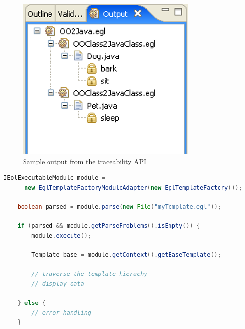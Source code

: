 \begin{figure}[htbp]
  \begin{center}
    \leavevmode
    \includegraphics[scale=0.6]{images/TraceView}
  \end{center}
  \caption{Sample output from the traceability API.}
  \label{fig:traceability}
\end{figure}


\begin{lstlisting}[language=Java, basicstyle=\ttfamily\footnotesize, language=EGL, tabsize=2, flexiblecolumns=true, caption=Programmatically accessing the EGL traceability API (in Java)., label=lst:traceability]
	IEolExecutableModule module = 
	  new EglTemplateFactoryModuleAdapter(new EglTemplateFactory());
	
	boolean parsed = module.parse(new File("myTemplate.egl"));
	
	if (parsed && module.getParseProblems().isEmpty()) {
		module.execute();

		Template base = module.getContext().getBaseTemplate();
		
		// traverse the template hierachy
		// display data 
		
	} else {
		// error handling
	}
\end{lstlisting}